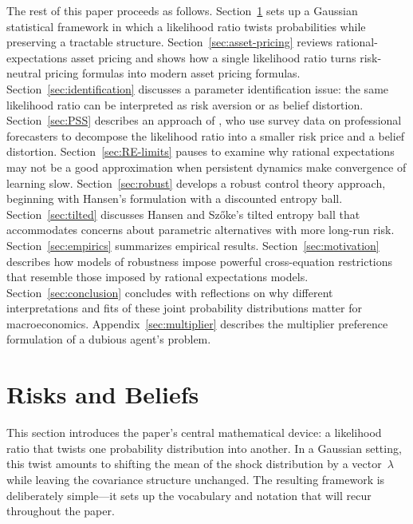 \documentclass[12pt]{article}
\theoremstyle{definition}
\begin{document}
The rest of this paper proceeds as follows.  Section~\ref{sec:risks-and-beliefs}
sets up a Gaussian statistical framework in which a likelihood ratio twists
probabilities while preserving a tractable structure.
Section~\ref{sec:asset-pricing} reviews rational-expectations asset
pricing and shows how a single likelihood ratio turns risk-neutral
pricing formulas into modern asset pricing formulas.
Section~\ref{sec:identification} discusses a parameter identification issue:
the same likelihood ratio can be interpreted as risk aversion or as
belief distortion. Section~\ref{sec:PSS} describes an approach of
\citet{PSS2015}, who use survey data on
professional forecasters to decompose the likelihood ratio into a
smaller risk price and a belief distortion.
Section~\ref{sec:RE-limits} pauses to examine why rational expectations
may not be a good approximation when persistent dynamics make convergence
of learning slow.
Section~\ref{sec:robust} develops a robust control theory approach,
beginning with Hansen's formulation with a discounted entropy ball. Section~\ref{sec:tilted}
discusses Hansen and Sz\H{o}ke's tilted entropy ball that
accommodates concerns about parametric alternatives with more long-run
risk.  Section~\ref{sec:empirics} summarizes empirical results. Section~\ref{sec:motivation} describes how models 
of robustness impose powerful cross-equation restrictions that resemble those imposed by rational expectations models.
Section~\ref{sec:conclusion} concludes with reflections on why different interpretations and fits of these
joint probability distributions matter for macroeconomics. Appendix~\ref{sec:multiplier} describes the multiplier preference formulation of a dubious agent's problem.


\section{Risks and Beliefs}
\label{sec:risks-and-beliefs}

This section introduces the paper's central mathematical device: a
likelihood ratio that twists one probability distribution into another.
In a Gaussian setting, this twist amounts to shifting the mean of the
shock distribution by a vector~$\lambda$ while leaving the covariance
structure unchanged.  The resulting framework is deliberately
simple---it sets up the vocabulary and notation that will recur
throughout the paper.
\end{document}
